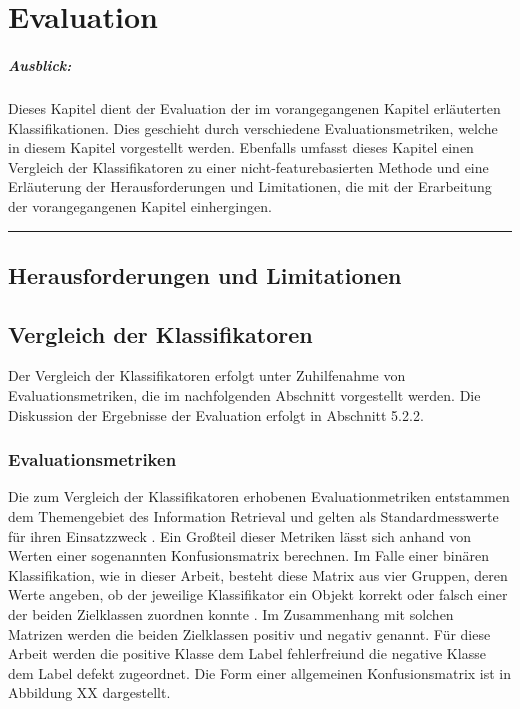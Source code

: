 
\chapter{Evaluation}

\paragraph{Ausblick:}
Dieses Kapitel dient der Evaluation der im vorangegangenen Kapitel erläuterten Klassifikationen. Dies geschieht durch verschiedene Evaluationsmetriken, welche in diesem Kapitel vorgestellt werden. Ebenfalls umfasst dieses Kapitel einen Vergleich der Klassifikatoren zu einer nicht-featurebasierten Methode und eine Erläuterung der Herausforderungen und Limitationen, die mit der Erarbeitung der vorangegangenen Kapitel einhergingen.
\\
\hrule

\section{Herausforderungen und Limitationen}

\section{Vergleich der Klassifikatoren}

Der Vergleich der Klassifikatoren erfolgt unter Zuhilfenahme von Evaluationsmetriken, die im nachfolgenden Abschnitt vorgestellt werden. Die Diskussion der Ergebnisse der Evaluation erfolgt in Abschnitt 5.2.2.

\subsection{Evaluationsmetriken}

Die zum Vergleich der Klassifikatoren erhobenen Evaluationmetriken entstammen dem Themengebiet des Information Retrieval und gelten als Standardmesswerte für ihren Einsatzzweck \cite{Sammut2017}. Ein Großteil dieser Metriken lässt sich anhand von Werten einer sogenannten Konfusionsmatrix berechnen. Im Falle einer binären Klassifikation, wie in dieser Arbeit, besteht diese Matrix aus vier Gruppen, deren Werte angeben, ob der jeweilige Klassifikator ein Objekt korrekt oder falsch einer der beiden Zielklassen zuordnen konnte \cite{Sammut2017}. Im Zusammenhang mit solchen Matrizen werden die beiden Zielklassen \glqq positiv\grqq{} und \glqq negativ\grqq{} genannt. Für diese Arbeit werden die positive Klasse dem Label \glqq fehlerfrei\grqq und die negative Klasse dem Label \glqq defekt\grqq{} zugeordnet. Die Form einer allgemeinen Konfusionsmatrix ist in Abbildung XX dargestellt.


